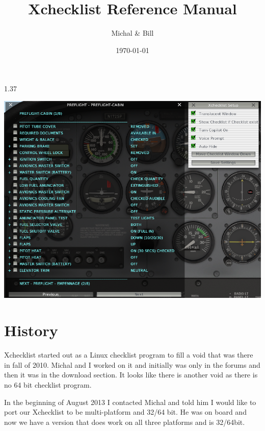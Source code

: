 \documentclass[11pt,parskip=half,a4paper]{scrartcl}
\begin{document}
\title{Xchecklist Reference Manual}
\author{Michal \& Bill}
\date{\today}

\maketitle

\begin{center}
1.37
\end{center}

\vspace{2cm}


\begin{center}
\includegraphics[width=15cm]{TranslucentXchecklist.png}
\end{center}


\thispagestyle{empty}
\newpage
\verb||
\tableofcontents

\newpage
\section{History}

Xchecklist started out as a Linux checklist program to fill a void that was there in fall of 2010. Michal and I worked on it and initially was only in the forums and then it was in the download section. It looks like there is another void as there is no 64 bit checklist program. \newline

In the beginning of August 2013 I contacted Michal and told him I would like to port our Xchecklist to be multi-platform and 32/64 bit. He was on board and now we have a version that does work on all three platforms and is 32/64bit.
\end{document}
